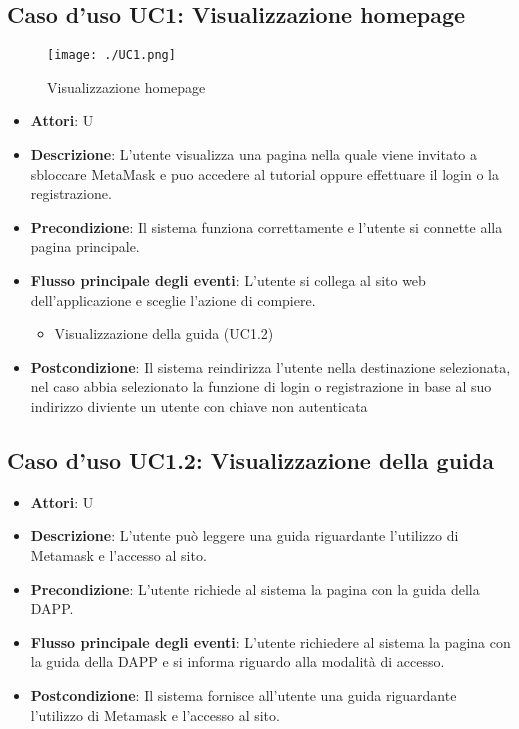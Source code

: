 \subsection{Caso d'uso \hypertarget{UC1}{UC1}: Visualizzazione homepage}
\begin{figure} [H]
\centering
\texttt{[image: ./UC1.png]}
\caption{Visualizzazione homepage}\label{}
\end{figure}
\begin{itemize}
\item \textbf{Attori}: U
\item \textbf{Descrizione}: L'utente visualizza una pagina nella quale viene invitato a sbloccare MetaMask e puo accedere al tutorial oppure effettuare il login o la registrazione.
\item \textbf{Precondizione}: Il sistema funziona correttamente e l'utente si connette alla pagina principale.
\item \textbf{Flusso principale degli eventi}: L'utente si collega al sito web dell'applicazione e sceglie l'azione di compiere.
\begin{itemize}
\item Visualizzazione della guida (UC1.2)
\end{itemize}
\item \textbf{Postcondizione}: Il sistema reindirizza l'utente nella destinazione selezionata, nel caso abbia selezionato la funzione di login o registrazione in base al suo indirizzo diviente un utente con chiave non autenticata
\end{itemize}
\subsection{Caso d'uso \hypertarget{UC1.2}{UC1.2}: Visualizzazione della guida}
\begin{itemize}
\item \textbf{Attori}: U
\item \textbf{Descrizione}: L'utente può leggere una guida riguardante l'utilizzo di Metamask e l'accesso al sito.
\item \textbf{Precondizione}: L'utente richiede al sistema la pagina con la guida della DAPP.
\item \textbf{Flusso principale degli eventi}: L'utente richiedere al sistema la pagina con la guida della DAPP e si informa riguardo alla modalità di accesso.
\item \textbf{Postcondizione}: Il sistema fornisce all'utente una guida riguardante l'utilizzo di Metamask e l'accesso al sito.
\end{itemize}
